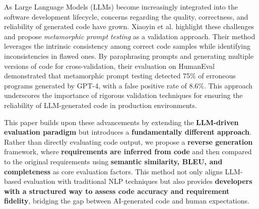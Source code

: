 As Large Language Models (LLMs) become increasingly integrated into the software development lifecycle, concerns regarding the quality, correctness, and reliability of generated code have grown. Xiaoyin et al. \cite{wang2024validating} highlight these challenges and propose \textit{metamorphic prompt testing} as a validation approach. Their method leverages the intrinsic consistency among correct code samples while identifying inconsistencies in flawed ones. By paraphrasing prompts and generating multiple versions of code for cross-validation, their evaluation on HumanEval demonstrated that metamorphic prompt testing detected 75\% of erroneous programs generated by GPT-4, with a false positive rate of 8.6\%. This approach underscores the importance of rigorous validation techniques for ensuring the reliability of LLM-generated code in production environments.

This paper builds upon these advancements by extending the \textbf{LLM-driven evaluation paradigm} but introduces a \textbf{fundamentally different approach}. Rather than directly evaluating code output, we propose a \textbf{reverse generation} framework, where \textbf{requirements are inferred from code} and then compared to the original requirements using \textbf{semantic similarity, BLEU, and completeness} as core evaluation factors. This method not only aligns LLM-based evaluation with traditional NLP techniques but also provides \textbf{developers with a structured way to assess code accuracy and requirement fidelity}, bridging the gap between AI-generated code and human expectations.
